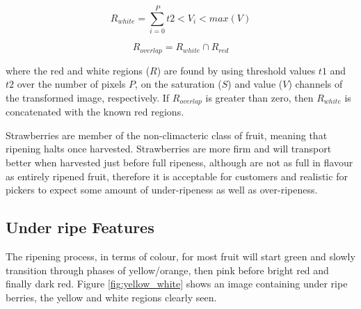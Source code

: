 \documentclass[fleqn,twoside,12pt]{report}
\begin{document}
\begin{equation}
R_{white} = \sum_{i=0}^{P}t2<V_i<max(V)
\label{white_berry_thresh}
\end{equation}

\begin{equation}
R_{overlap} = R_{white} \cap R_{red}
\label{intersect_white_berry}
\end{equation}

where the red and white regions ($R$) are found by using threshold values $t1$ and $t2$ over the number of pixels $P$, on the saturation ($S$) and value ($V$) channels of the transformed image, respectively. If $R_{overlap}$ is greater than zero, then $R_{white}$ is concatenated with the known red regions. 

Strawberries are member of the non-climacteric class of fruit, meaning that ripening halts once harvested. Strawberries are more firm and will transport better when harvested just before full ripeness, although are not as full in flavour as entirely ripened fruit\cite{artur}, therefore it is acceptable for customers and realistic for pickers to expect some amount of under-ripeness as well as over-ripeness. 


\subsection{Under ripe Features}

The ripening process, in terms of colour, for most fruit will start green and slowly transition through phases of yellow/orange, then pink before bright red and finally dark red. Figure \ref{fig:yellow_white} shows an image containing under ripe berries, the yellow and white regions clearly seen.
\end{document}

